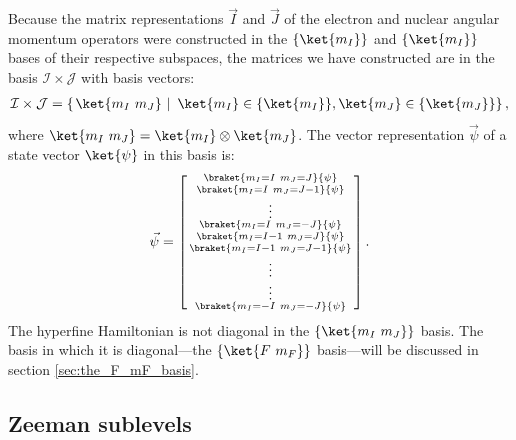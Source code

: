 Because the matrix representations $\vec I$ and $\vec J$ of the electron and nuclear angular momentum operators were constructed in the $\{\ket{m_I}\}$ and $\{\ket{m_I}\}$ bases of their respective subspaces, the matrices we have constructed are in the basis $\mathcal{I}\times\mathcal{J}$ with basis vectors:
\begin{align}
\mathcal{I}\times\mathcal{J} = \left\{\left. \ket{m_I\ m_J} \ \right| \ \ket{m_I} \in \{\ket{m_I}\}, \ket{m_J} \in \{\ket{m_J}\}\right\},
\end{align}
where $\ket{m_I\ m_J} = \ket{m_I} \otimes \ket{m_J}$. The vector representation $\vec\psi$ of a state vector $\ket{\psi}$ in this basis is:
\begin{align}
\vec \psi = \left[\begin{smallmatrix}
\braket{m_I=I\ m_J=J}{\psi}\\
\braket{m_I=I\ m_J=J-1}{\psi}\\
\vdots\\
\braket{m_I=I\ m_J=-J}{\psi}\\
\braket{m_I=I-1\ m_J=J}{\psi}\\
\braket{m_I=I-1\ m_J=J-1}{\psi}\\
\vdots\\
\vdots\\
\braket{m_I=-I\ m_J=-J}{\psi}\\
\end{smallmatrix}\right].
\end{align}
The hyperfine Hamiltonian is not diagonal in the $\{\ket{m_I\ m_J}\}$ basis. The basis in which it is diagonal---the $\{\ket{F\ m_F}\}$ basis---will be discussed in section \ref{sec:the_F_mF_basis}.

\subsection{Zeeman sublevels}\label{sec:zeeman_sublevels}

